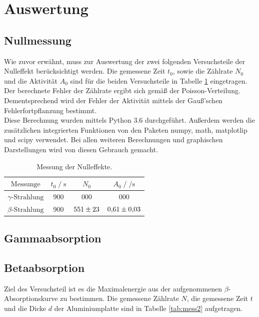 \section{Auswertung}
\label{sec:Auswertung}

\subsection{Nullmessung}

Wie zuvor erwähnt, muss zur Auswertung der zwei folgenden Versuchsteile der Nulleffekt berücksichtigt 
werden. Die gemessene Zeit $t_0$, sowie die Zählrate $N_0$ und die Aktivität $A_0$ sind für die beiden
Versuchsteile in Tabelle \ref{tab:null} eingetragen. Der berechnete Fehler der Zählrate ergibt sich gemäß der 
Poisson-Verteilung. Dementsprechend wird der Fehler der Aktivität mittels der Gauß'schen Fehlerfortpflanzung
bestimmt. \\
Diese Berechnung wurden mittels Python 3.6 durchgeführt. Außerdem werden die zusätzlichen integrierten 
Funktionen von den Paketen numpy, math, matplotlip und scipy verwendet. Bei allen weiteren Berechnungen und
graphischen Darstellungen wird von diesen Gebrauch gemacht. 

\begin{table}
    \centering
    \caption{Messung der Nulleffekte.}
    \label{tab:null}
    \begin{tabular}{c c c c}
    \toprule
    $\text{Messunge}$ & $ t_0 \;/\; \si{\second} $  & $N_0$ & $A_0 \;/\; \si{\per\second}$\\
    \midrule 
        $\gamma \text{-Strahlung}$ & 900 &  000 & 000\\
        $\beta \text{-Strahlung}$  & 900 & $\num{551+-23}$ & $\num{0.61+-0.03}$\\     
    \bottomrule
    \end{tabular}
\end{table}

\subsection{Gammaabsorption}


\subsection{Betaabsorption}


Ziel des Versuchsteil ist es die Maximalenergie aus der aufgenommenen $\beta$-Absorptionskurve zu 
bestimmen. Die gemessene Zählrate $N$, die gemessene Zeit $t$ und die Dicke $d$ der Aluminiumplatte 
sind in Tabelle \ref{tab:mess2} aufgetragen. 

